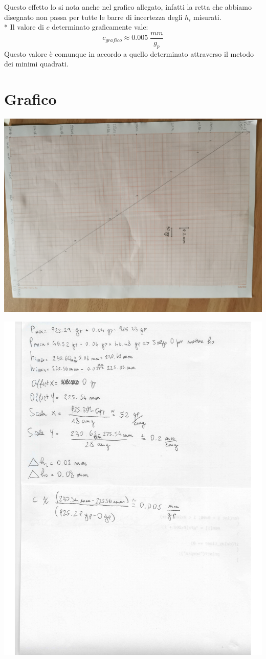 \documentclass[10pt,a4paper]{book}
\begin{document}
Questo effetto lo si nota anche nel grafico allegato, infatti la retta che abbiamo disegnato non passa per tutte le barre di incertezza degli $h_i$ misurati.\\*
Il valore di $c$ determinato graficamente vale:
$$
c_{grafico} \approx 0.005\; \frac{mm}{g_p}
$$
Questo valore è comunque in accordo a quello determinato attraverso il metodo dei minimi quadrati.
\section*{Grafico}
\begin{center}
\includegraphics[scale=0.18, angle=90]{imggrafico}
\end{center}
\begin{center}
	\includegraphics[width=1\linewidth]{graficoconti}
\end{center}
\newpage
\end{document}
